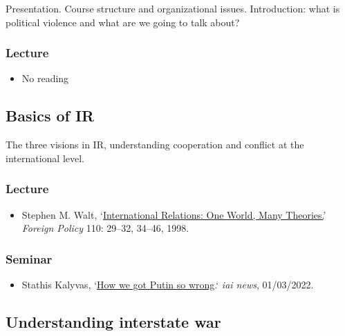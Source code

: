 \documentclass[12pt, a4paper]{article}
\begin{document}
Presentation. Course structure and organizational issues. Introduction: what is political violence and what are we going to talk about?

\subsubsection*{Lecture}

\begin{itemize}
\setlength\itemsep{0pt}
\item No reading
\end{itemize}

\hline %

\subsection{Basics of IR}\label{ir_basics}

The three visions in IR, understanding cooperation and conflict at the international level.

\subsubsection*{Lecture}

\begin{itemize}
\setlength\itemsep{0pt}
\item Stephen M. Walt, `\href{https://doi.org/10.2307/1149275}{International Relations: One World, Many Theories.}' \textit{Foreign Policy} 110: 29--32, 34--46, 1998.
\end{itemize}

\subsubsection*{Seminar}

\begin{itemize}
  \item Stathis Kalyvas, `\href{https://iai.tv/articles/how-we-got-putin-so-wrong-auid-2063}{How we got Putin so wrong}.` \textit{iai news}, 01/03/2022.
\end{itemize}

\hline %

\subsection{Understanding interstate war}\label{interstate}
\end{document}
